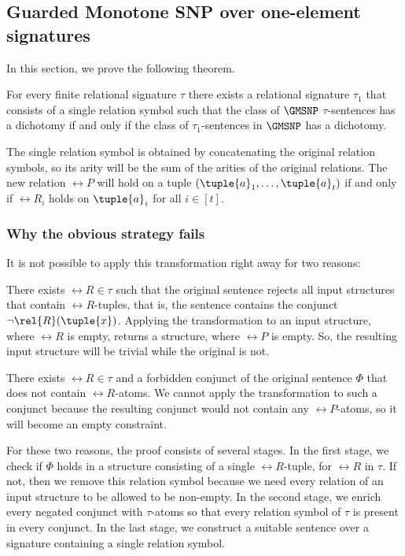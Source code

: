 \documentclass{lmcs}
\begin{document}
\subsection{Guarded Monotone SNP over one-element signatures}\label{section:gmsnp}

In this section, we prove the following theorem.

\begin{thm}\label{th:gmsnp} 
For every finite relational signature $\tau$ there exists a relational signature $\tau_1$ that consists of a single relation symbol such that the class of $\GMSNP$ $\tau$-sentences has a dichotomy if and only if the class of $\tau_1$-sentences in $\GMSNP$ has a dichotomy.
\end{thm} 



The single relation symbol is obtained by concatenating the original relation symbols, so its arity will be the sum of the arities of the original relations.
The new relation $\rel{P}$ will hold on a tuple $(\tuple{a}_1,\ldots,\tuple{a}_t)$ if and only if $\rel{R}_i$ holds on $\tuple{a}_i$ for all $i\in[t]$.
\subsubsection*{Why the obvious strategy fails}
It is not possible to apply this transformation right away for two reasons:
\begin{compactenum}[(a)]
\item There exists $\rel{R}\in\tau$ such that the original sentence rejects all input structures that contain $\rel{R}$-tuples, that is, the sentence contains the conjunct $\neg\rel{R}(\tuple{x})$.
Applying the transformation to an input structure, where $\rel{R}$ is empty, returns a structure, where $\rel{P}$ is empty.
So, the resulting input structure will be trivial while the original is not.
\item There exists $\rel{R}\in\tau$ and a forbidden conjunct of the original sentence $\Phi$ that does not contain $\rel{R}$-atoms. 
We cannot apply the transformation to such a conjunct because the resulting conjunct would not contain any $\rel{P}$-atoms, so it will become an empty constraint.
\end{compactenum}
For these two reasons, the proof consists of several stages.
In the first stage, we check if $\Phi$ holds in a structure consisting of a
single $\rel{R}$-tuple, for $\rel{R}$ in $\tau$. If not, then we remove this relation symbol because we need every relation of an input structure to be allowed to be non-empty.
In the second stage, we enrich every negated conjunct with $\tau$-atoms so that every relation symbol of $\tau$ is present in every conjunct.
In the last stage, we construct a suitable sentence over a signature containing a single relation symbol.
\end{document}
